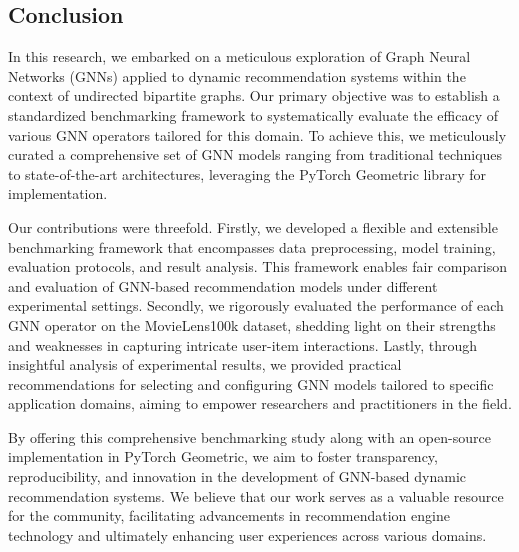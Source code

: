 \documentclass[bst/sn-nature]{sn-jnl}
\begin{document}
\begin{multicols}{2}
\section{Conclusion}

\quad In this research, we embarked on a meticulous exploration of Graph Neural Networks (GNNs) applied to dynamic recommendation systems within the context of undirected bipartite graphs. Our primary objective was to establish a standardized benchmarking framework to systematically evaluate the efficacy of various GNN operators tailored for this domain. To achieve this, we meticulously curated a comprehensive set of GNN models ranging from traditional techniques to state-of-the-art architectures, leveraging the PyTorch Geometric library for implementation.

Our contributions were threefold. Firstly, we developed a flexible and extensible benchmarking framework that encompasses data preprocessing, model training, evaluation protocols, and result analysis. This framework enables fair comparison and evaluation of GNN-based recommendation models under different experimental settings. Secondly, we rigorously evaluated the performance of each GNN operator on the MovieLens100k dataset, shedding light on their strengths and weaknesses in capturing intricate user-item interactions. Lastly, through insightful analysis of experimental results, we provided practical recommendations for selecting and configuring GNN models tailored to specific application domains, aiming to empower researchers and practitioners in the field.

By offering this comprehensive benchmarking study along with an open-source implementation in PyTorch Geometric, we aim to foster transparency, reproducibility, and innovation in the development of GNN-based dynamic recommendation systems. We believe that our work serves as a valuable resource for the community, facilitating advancements in recommendation engine technology and ultimately enhancing user experiences across various domains.

\end{multicols}

\clearpage
\end{document}
